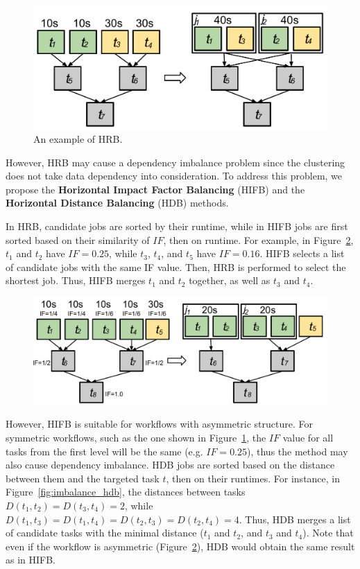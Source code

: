 \begin{figure}[htb]
	\centering
	\includegraphics[width=0.85\linewidth]{figures/imbalance/hrb.pdf}
	\caption{An example of HRB.}
	\label{fig:imbalance_hrb}
\end{figure}

\noindent However, HRB may cause a dependency imbalance problem since the clustering does not take data dependency into consideration. To address this problem, we propose the \textbf{Horizontal Impact Factor Balancing} (HIFB) and the \textbf{Horizontal Distance Balancing} (HDB) methods. 

In HRB, candidate jobs are sorted by their runtime, while in HIFB jobs are first sorted based on their similarity of $IF$, then on runtime. For example, in Figure~\ref{fig:imbalance_hifb}, $t_1$ and $t_2$ have $IF = 0.25$, while $t_3$, $t_4$, and $t_5$ have $IF = 0.16$. HIFB selects a list of candidate jobs with the same IF value. Then, HRB is performed to select the shortest job. Thus, HIFB merges $t_1$ and $t_2$ together, as well as $t_3$ and $t_4$.

\begin{figure}[htb]
	\centering
	\includegraphics[width=\linewidth]{figures/imbalance/hifb.pdf}
	\label{fig:imbalance_hifb}
\end{figure}

However, HIFB is suitable for workflows with asymmetric structure. For symmetric workflows, such as the one shown in Figure~\ref{fig:imbalance_hrb}, the $IF$ value for all tasks from the first level will be the same (e.g. $IF=0.25$), thus the method may also cause dependency imbalance. HDB jobs are sorted based on the distance between them and the targeted task $t$, then on their runtimes. For instance, in Figure~\ref{fig:imbalance_hdb}, the distances between tasks $D(t_1,t_2)=D(t_3,t_4)=2$, while $D(t_1,t_3)=D(t_1,t_4)=D(t_2,t_3)=D(t_2,t_4)=4$. Thus, HDB merges a list of candidate tasks with the minimal distance ($t_1$ and $t_2$, and $t_3$ and $t_4$). Note that even if the workflow is asymmetric (Figure~\ref{fig:imbalance_hifb}), HDB would obtain the same result as in HIFB. 

